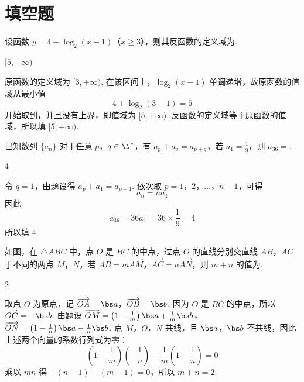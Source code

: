 \section{填空题}

\begin{problem}
设函数 \(y = 4 + \log_{2}(x - 1)\)（\(x \geqslant 3\)），则其反函数的定义域为\fillinblank{}.
\end{problem}

\begin{answer}
\([5,+\infty)\)
\end{answer}

\begin{solution}
原函数的定义域为 \([3,+\infty)\). 在该区间上，\(\log_2(x-1)\) 单调递增，故原函数的值域从最小值
\[
4+\log_2(3-1)=5
\]
开始取到，并且没有上界，即值域为 \([5,+\infty)\). 反函数的定义域等于原函数的值域，所以填 \([5,+\infty)\).
\end{solution}

\begin{problem}
已知数列 \(\{a_n\}\) 对于任意 \(p\)，\(q \in \N^*\)，有 \(a_p + a_q = a_{p+q}\)，若 \(a_1 = \frac{1}{9}\)，则 \(a_{36} =\)\fillinblank{}.
\end{problem}

\begin{answer}
4
\end{answer}

\begin{solution}
令 \(q=1\)，由题设得 \(a_p+a_1=a_{p+1}\). 依次取 \(p=1\)，\(2\)，\(\ldots\)，\(n-1\)，可得
\[
a_n=na_1
\]
因此
\[
a_{36}=36a_1=36\times\frac19=4
\]
所以填 \(4\).
\end{solution}

\begin{problem}
如图，在 \(\triangle ABC\) 中，点 \(O\) 是 \(BC\) 的中点，过点 \(O\) 的直线分别交直线 \(AB\)，\(AC\) 于不同的两点 \(M\)，\(N\)，若 \(\overrightarrow{AB} = m\overrightarrow{AM}\)，\(\overrightarrow{AC} = n\overrightarrow{AN}\)，则 \(m + n\) 的值为\fillinblank{}.

\end{problem}

\begin{answer}
2
\end{answer}

\begin{solution}
取点 \(O\) 为原点，记 \(\overrightarrow{OA}=\bs a\)，\(\overrightarrow{OB}=\bs b\). 因为 \(O\) 是 \(BC\) 的中点，所以 \(\overrightarrow{OC}=-\bs b\). 由题设
\(\overrightarrow{OM}=\left(1-\frac1m\right)\bs a+\frac1m\bs b\)，\(\overrightarrow{ON}=\left(1-\frac1n\right)\bs a-\frac1n\bs b\).
点 \(M\)，\(O\)，\(N\) 共线，且 \(\bs a\)，\(\bs b\) 不共线，因此上述两个向量的系数行列式为零：
\[
\left(1-\frac1m\right)\left(-\frac1n\right)-\frac1m\left(1-\frac1n\right)=0
\]
乘以 \(mn\) 得 \(-(n-1)-(m-1)=0\)，所以 \(m+n=2\).
\end{solution}

